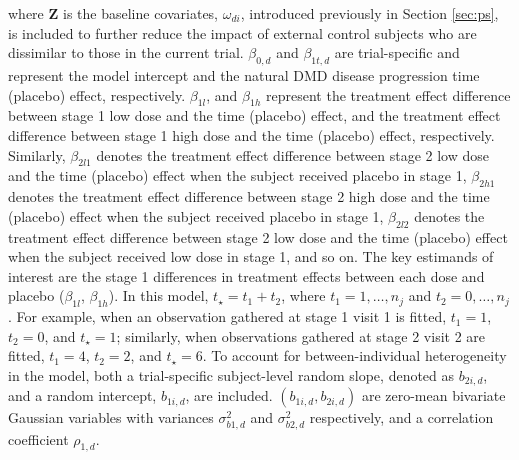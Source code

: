 where $\boldsymbol{Z}$ is the baseline covariates, $\omega_{di}$, introduced previously in Section \ref{sec:ps}, is included to further reduce the impact of external control subjects who are dissimilar to those in the current trial. \(\beta_{0, d}\) and \(\beta_{1t,d}\) are trial-specific and represent the model intercept and the natural \ac{DMD} disease progression time (placebo) effect, respectively. \(\beta_{1l}\), and \(\beta_{1h}\) represent the treatment effect difference between stage 1 low dose and the time (placebo) effect, and the treatment effect difference between stage 1 high dose and the time (placebo) effect, respectively. Similarly, \(\beta_{2l1}\) denotes the treatment effect difference between stage 2 low dose and the time (placebo) effect when the subject received placebo in stage 1, \(\beta_{2h1}\) denotes the treatment effect difference between stage 2 high dose and the time (placebo) effect when the subject received placebo in stage 1, \(\beta_{2l2}\) denotes the treatment effect difference between stage 2 low dose and the time (placebo) effect when the subject received low dose in stage 1, and so on. The key estimands of interest are the stage 1 differences in treatment effects between each dose and placebo ($\beta_{1l}$, $\beta_{1h}$). In this model, \( t_{\star} = t_1 + t_2 \), where \( t_1 = 1, \ldots, n_j \) and \( t_2 = 0, \ldots, n_j \). For example, when an observation gathered at stage 1 visit 1 is fitted, \( t_1 = 1 \), \( t_2 = 0 \), and \( t_{\star} = 1 \); similarly, when observations gathered at stage 2 visit 2 are fitted, \( t_1 = 4 \), \( t_2 = 2 \), and \( t_{\star} = 6 \). To account for between-individual heterogeneity in the model, both a trial-specific subject-level random slope, denoted as $b_{2i, d}$, and a random intercept, $b_{1i, d}$, are included. $(b_{1i, d}, b_{2i, d})$ are zero-mean bivariate Gaussian variables with variances $\sigma_{b1, d}^2$ and $\sigma_{b2, d}^2$ respectively, and a correlation coefficient $\rho_{1,d}$.

